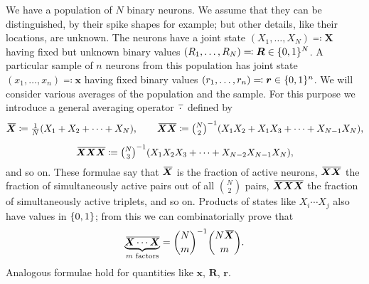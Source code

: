 \documentclass{article}
\theoremstyle{remark}
\theoremstyle{innote}
\newcommand*{\defd}{\coloneqq}
\newcommand*{\defs}{\eqqcolon}
\renewcommand*{\|}{\mathpunct{|}}%
\newcommand*{\dotv}{\mathord{\,\cdot\,}}%
\DeclarePairedDelimiter\set{\{}{\}}
\theoremstyle{simple}
\newtheorem*{simplenote}{}
\newcommand*{\puzzle}{{\fontencoding{U}\fontfamily{fontawesometwo}\selectfont\symbol{225}}}
\newcommand{\mynote}[1]{ {\color{notecolour}\puzzle\ #1}}
\newcommand*{\widebar}[1]{{\mkern1.5mu\skew{2}\overline{\mkern-1.5mu#1\mkern-1.5mu}\mkern 1.5mu}}
\newcommand*{\av}{\widebar} %
\newcommand*{\sav}{\widebar} %
\newcommand*{\yxx}{x}%
\newcommand*{\yx}{\bm{\yxx}}%
\newcommand*{\yX}{\bm{X}}%
\newcommand*{\yXf}{\av{\yX}}%
\newcommand*{\yXXf}{\av{\yX\yX}}%
\newcommand*{\yr}{\bm{r}}%
\newcommand*{\yR}{\bm{R}}%
\begin{document}
We have a population of $N$ binary neurons. We assume that they can be
distinguished, by their spike shapes for example; but other details, like
their locations, are unknown. The neurons have a joint state
$(X_1,\dotsc,X_N) \defs \yX$ having fixed but unknown binary values
$(R_1,\dotsc,R_N)\defs \yR \in \set{0,1}^N$. A particular sample of $n$
neurons from this population has joint state $(x_1, \dotsc, x_n) \defs \yx$
having fixed binary values $(r_1, \dotsc, r_n)\defs\yr \in \set{0,1}^n$. We
will consider various averages of the population and the sample. For this
purpose we introduce a general averaging operator $\sav{\dotv}$ defined by
\begin{equation}
  \begin{gathered}
    \av{\yX} \defd \tfrac{1}{N} (X_1 + X_2 + \dotsb + X_N),
   \qquad%
    \av{\yX \yX} \defd \tbinom{N}{2}^{-1} (X_1 X_2 + X_1 X_3 + \dotsb +
    X_{N-1} X_N),
    \\[2\jot]
    \av{\yX\yX\yX} \defd \tbinom{N}{3}^{-1} (X_1 X_2 X_3 +%
    \dotsb + X_{N-2} X_{N-1}X_N),
  \end{gathered}
\end{equation}
and so on.
These formulae say that $\yXf$ is the fraction of active neurons, $\yXXf$
the fraction of simultaneously active pairs out of all $\binom{N}{2}$
pairs, $\av{\yX\yX\yX}$ the fraction of simultaneously active triplets, and
so on. Products of states like $X_i \dotsm X_j$ also have values in
$\set{0,1}$; from this we can combinatorially  prove that
\begin{equation}
  \label{eq:products_intermsof_average}
  \av{\underbrace{\yX\dotsm\yX}_{\text{$m$ factors}}}
  = \binom{N}{m}^{-1}\binom{N\yXf}{m}.
\end{equation}
Analogous formulae  hold for quantities like $\yx$, $\yR$, $\yr$.

\end{document}
